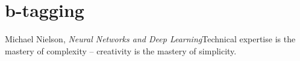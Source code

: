 \chapter{b-tagging}
\begin{chapquote}{Michael Nielson, \emph{Neural Networks and Deep Learning}}{Technical expertise is the mastery of complexity -- creativity is the mastery of simplicity.}
\end{chapquote}





\FloatBarrier
\clearpage


\FloatBarrier
\clearpage






%
